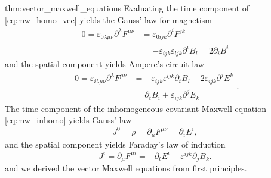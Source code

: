 \begin{delayedproof}{thm:vector_maxwell_equations}
	Evaluating the time component of \cref{eq:mw_homo_vec} yields the Gauss' law for magnetism
	\begin{equation*}
		\begin{split}
			0
			=
			\varepsilon_{0\lambda\mu\nu}\partial^\lambda F^{\mu\nu}
			&=
			\varepsilon_{0ijk}\partial^iF^{jk}
			\\
			&=
			-
			\varepsilon_{ijk}\varepsilon_{ljk}
			\partial^i B_l
			=
			2\partial_iB^i
		\end{split}
		\label{eq:mw_gauss_law_mag}
	\end{equation*}
	and the spatial component yields Ampere's circuit law
	\begin{equation*}
		\begin{split}
			0
			=
			\varepsilon_{i\lambda\mu\nu}
			\partial^\lambda
			F^{\mu\nu}
			&=
			-
			\varepsilon_{ijk}
			\varepsilon^{ljk}
			\partial_t B_l
			-
			2\varepsilon_{ijk}
			\partial^jE^k
			\\
			&=
			\partial_tB_i
			+
			\varepsilon_{ijk}
			\partial^jE_k
		\end{split}
		\label{eq:mw_ampere_law}.
	\end{equation*}
	The time component of the inhomogeneous covariant Maxwell equation \cref{eq:mw_inhomo} yields Gauss' law
	\begin{equation*}
		J^0
		=
		\rho
		=
		\partial_\mu F^{\mu\nu}
		=
		\partial_i E^i
		\label{eq:mw_gauss_law},
	\end{equation*}
	and the spatial component yields Faraday's law of induction
	\begin{equation*}
		J^i
		=
		\partial_\mu F^{\mu i}
		=
		-\partial_t E^i
		+\varepsilon^{ijk}\partial_j B_k
		\label{eq:mw_faraday_law}.
	\end{equation*}
	and we derived the vector Maxwell equations from first principles.
\end{delayedproof}